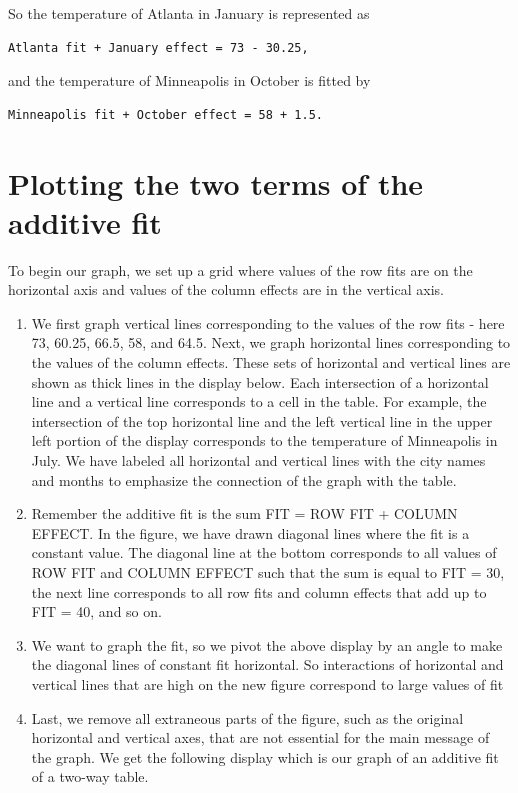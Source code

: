 \documentclass[
]{book}
\begin{document}
So the temperature of Atlanta in January is represented as

\begin{verbatim}
Atlanta fit + January effect = 73 - 30.25,
\end{verbatim}

and the temperature of Minneapolis in October is fitted by

\begin{verbatim}
Minneapolis fit + October effect = 58 + 1.5.
\end{verbatim}

\hypertarget{plotting-the-two-terms-of-the-additive-fit}{%
\section{Plotting the two terms of the additive fit}\label{plotting-the-two-terms-of-the-additive-fit}}

To begin our graph, we set up a grid where values of the row fits are on the horizontal axis and values of the column effects are in the vertical axis.

\begin{enumerate}
\def\labelenumi{\arabic{enumi}.}
\item
  We first graph vertical lines corresponding to the values of the row fits - here 73, 60.25, 66.5, 58, and 64.5. Next, we graph horizontal lines corresponding to the values of the column effects. These sets of horizontal and vertical lines are shown as thick lines in the display below. Each intersection of a horizontal line and a vertical line corresponds to a cell in the table. For example, the intersection of the top horizontal line and the left vertical line in the upper left portion of the display corresponds to the temperature of Minneapolis in July. We have labeled all horizontal and vertical lines with the city names and months to emphasize the connection of the graph with the table.
\item
  Remember the additive fit is the sum FIT = ROW FIT + COLUMN EFFECT. In the figure, we have drawn diagonal lines where the fit is a constant value. The diagonal line at the bottom corresponds to all values of ROW FIT and COLUMN EFFECT such that the sum is equal to FIT = 30, the next line corresponds to all row fits and column effects that add up to FIT = 40, and so on.
\item
  We want to graph the fit, so we pivot the above display by an angle to make the diagonal lines of constant fit horizontal. So interactions of horizontal and vertical lines that are high on the new figure correspond to large values of fit
\item
  Last, we remove all extraneous parts of the figure, such as the original horizontal and vertical axes, that are not essential for the main message of the graph. We get the following display which is our graph of an additive fit of a two-way table.
\end{enumerate}
\end{document}
